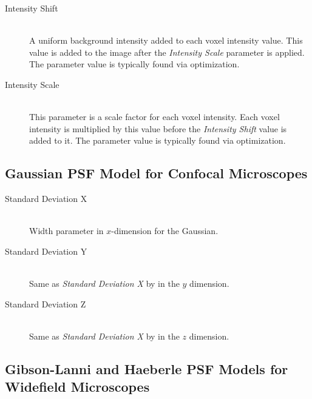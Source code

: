 \documentclass[11pt,titlepage,twoside]{article}
\begin{document}
\begin{description}
  \item[Intensity Shift] \hfill \\
   A uniform background intensity added to each voxel intensity value. This value is added to the image after the \emph{Intensity Scale} parameter is applied. The parameter value is typically found via optimization.
  
  \item[Intensity Scale] \hfill \\
   This parameter is a scale factor for each voxel intensity. Each voxel intensity is multiplied by this value before the \emph{Intensity Shift} value is added to it. The parameter value is typically found via optimization.

\end{description}

\subsection{Gaussian PSF Model for Confocal Microscopes}

\begin{description}

  \item[Standard Deviation X] \hfill \\
   Width parameter in $x$-dimension for the Gaussian.
   
  \item[Standard Deviation Y] \hfill \\
   Same as \emph{Standard Deviation X} by in the $y$ dimension.
   
  \item[Standard Deviation Z] \hfill \\
   Same as \emph{Standard Deviation X} by in the $z$ dimension.

\end{description}

\subsection{Gibson-Lanni and Haeberle PSF Models for Widefield Microscopes}
\end{document}
